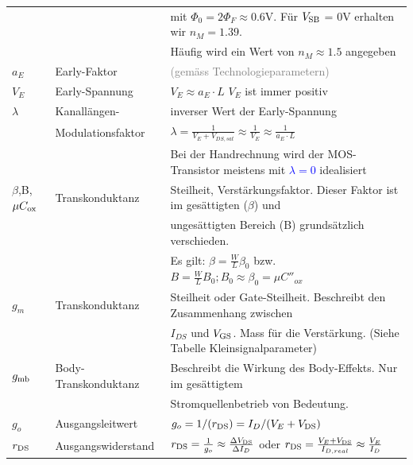 \begin{tabular}{| l | l | l |}
                    &                       & mit $\Phi_0 = 2\Phi_F\approx0.6$V. Für $V_{\rm SB}$ = 0V erhalten wir $n_M = 1.39.$ \\
                    &                       & Häufig wird ein Wert von $n_M\approx1.5$ angegeben \\
    \hline
    $a_E$           & Early-Faktor          & \textcolor{gray}{(gemäss Technologieparametern)} \\
    \hline
    $V_E$           & Early-Spannung        & $V_E \approx a_E \cdot L$ \hspace{10pt} $V_E$ ist immer positiv \\
    \hline
    $\lambda$       & Kanallängen-          & inverser Wert der Early-Spannung \\
                    & Modulationsfaktor     & $\lambda = \frac{1}{V_E + V_{DS,sat}}\approx\frac{1}{V_E}\approx\frac{1}{a_E \cdot L}$\\
                    &                       & Bei der Handrechnung wird der MOS-Transistor meistens mit \textcolor{blue}{$\lambda=0$} idealisiert\\
    \hline
    $\beta$,B,$\mu C_{\rm ox}$       & Transkonduktanz       & Steilheit, Verstärkungsfaktor. Dieser Faktor ist im gesättigten ($\beta$) und \\
                    &                       & ungesättigten Bereich (B) grundsätzlich verschieden. \\
                    &                       & Es gilt: $\beta = \frac{W}{L}\beta_0$ bzw. $B = \frac{W}{L}B_0; B_0\approx \beta_0 = \mu C''_{ox}$ \\
    \hline
    $g_m$           & Transkonduktanz       & Steilheit oder Gate-Steilheit. Beschreibt den Zusammenhang zwischen \\
                    &                       & $I_{DS}$ und $V_{\rm GS}$. Mass für die Verstärkung. (Siehe Tabelle Kleinsignalparameter) \\
    \hline
    $g_{\rm mb}$        & Body-Transkonduktanz  & Beschreibt die Wirkung des Body-Effekts. Nur im gesättigtem \\
                    &                       & Stromquellenbetrieb von Bedeutung. \\
    \hline
    $g_o$           & Ausgangsleitwert      & $g_o = 1/(r_{\rm DS}) = I_D/(V_E + V_{\rm DS})$\\
    \hline
    $r_{\rm DS}$        & Ausgangswiderstand    & $r_{\rm DS} = \frac{1}{g_o}\approx\frac{\Delta V_{\rm DS}}{\Delta I_D}$ oder $r_{\rm DS} = \frac{V_E + V_{\rm DS}}{I_{D,real}}\approx\frac{V_E}{I_D}$\\

\end{tabular}
